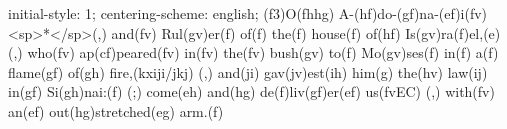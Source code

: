 initial-style: 1;
centering-scheme: english;
(f3)O(fhhg) A-(hf)do-(gf)na-(ef)i(fv) <sp>*</sp>(,) and(fv) Rul(gv)er(f) of(f) the(f) house(f) of(hf) Is(gv)ra(f)el,(e) (,) who(fv) ap(cf)peared(fv) in(fv) the(fv) bush(gv) to(f) Mo(gv)ses(f) in(f) a(f) flame(gf) of(gh) fire,(kxiji/jkj) (,) and(ji) gav(jv)est(ih) him(g) the(hv) law(ij) in(gf) Si(gh)nai:(f) (;) come(eh) and(hg) de(f)liv(gf)er(ef) us(fvEC) (,) with(fv) an(ef) out(hg)stretched(eg) arm.(f)
